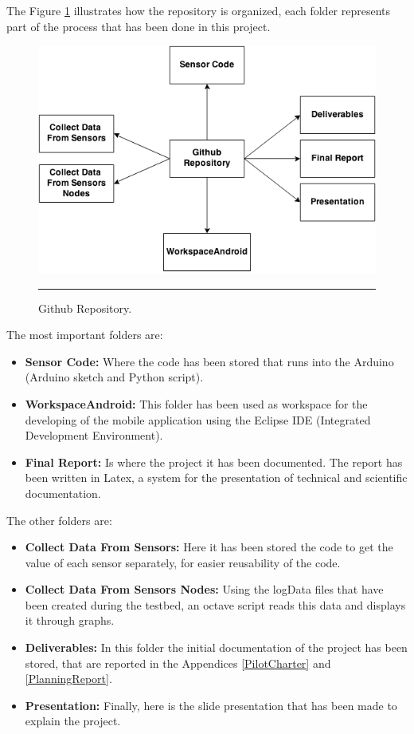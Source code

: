 \documentclass[12pt, a4paper,twoside]{tesi_upf}
\begin{document}
		The Figure \ref{fig:repository} illustrates how the repository is organized, each folder represents part of the process that has been done in this project.
		
		\begin{figure}[htbp]
			\centering
				  \includegraphics[scale=0.6]{./Figures/repository.png}
				  \rule{25em}{0.5pt}
			\caption[Github Repository]{Github Repository.}
			\label{fig:repository}
		\end{figure} 
		
		The most important folders are:
		\begin{itemize}
			\item {\bf Sensor Code:} Where the code has been stored that runs into the Arduino (Arduino sketch and Python script).
			\item {\bf WorkspaceAndroid:} This folder has been used as workspace for the developing of the mobile application using the Eclipse IDE (Integrated Development Environment).
			\item {\bf Final Report:} Is where the project it has been documented. The report has been written in Latex, a system for the presentation of technical and scientific documentation.
		\end{itemize}
		
		The other folders are:
		\begin{itemize}
			\item {\bf Collect Data From Sensors:} Here it has been stored the code to get the value of each sensor separately, for easier reusability of the code.
			\item {\bf Collect Data From Sensors Nodes:} Using the logData files that have been created during the testbed, an octave script reads this data and displays it through graphs.
			\item {\bf Deliverables:} In this folder the initial documentation of the project has been stored, that are reported in the Appendices \ref{PilotCharter} and \ref{PlanningReport}.
			\item {\bf Presentation:} Finally, here is the slide presentation that has been made to explain the project.
		\end{itemize}
		
\end{document}
